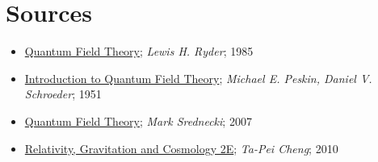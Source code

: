 \documentclass{article}
\begin{document}
        




        \clearpage
        \section{Sources}
                \begin{itemize}
                        \item \underline{Quantum Field Theory}; \textit{Lewis H. Ryder}; 1985
                        \item \underline{Introduction to Quantum Field Theory}; \textit{Michael E. Peskin, Daniel V. Schroeder}; 1951
                        \item \underline{Quantum Field Theory}; \textit{Mark Srednecki}; 2007
                        \item \underline{Relativity, Gravitation and Cosmology 2E}; \textit{Ta-Pei Cheng}; 2010
                \end{itemize}
\end{document}

